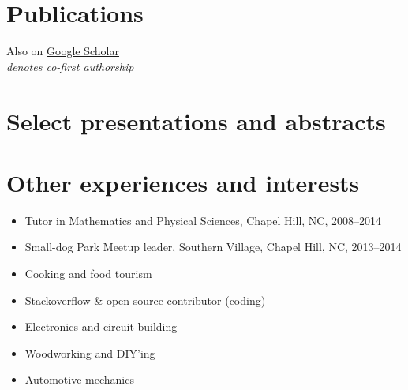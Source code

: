 \documentclass{article}
\begin{document}
\section*{Publications}
  
  Also on \href{https://scholar.google.com/citations?user=tcMs9UEAAAAJ&hl=en}{Google Scholar} \\
  \textsuperscript{\textbf{\textasteriskcentered}} \textit{denotes co-first authorship}
  
  
  
\section*{Select presentations and abstracts}
  

\section*{Other experiences and interests}
  \begin{itemize}%
    \item Tutor in Mathematics and Physical Sciences, Chapel Hill, NC, 2008--2014
    \item Small-dog Park Meetup leader, Southern Village, Chapel Hill, NC, 2013--2014
    \item Cooking and food tourism
    \item Stackoverflow \& open-source contributor (coding)
    \item Electronics and circuit building
    \item Woodworking and DIY'ing
    \item Automotive mechanics
  \end{itemize}
\end{document}
